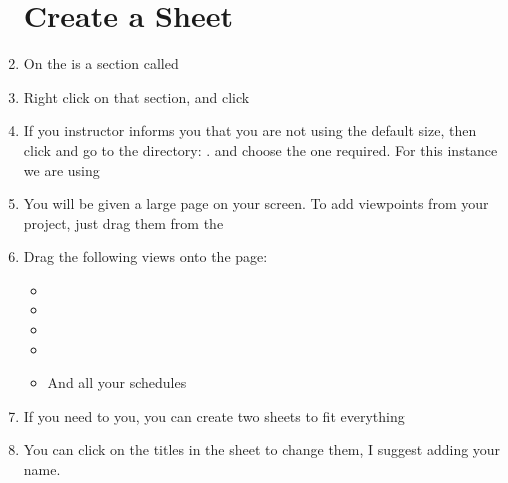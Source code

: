 \documentclass{tufte-book} %
\begin{document}
\begin{enumerate}
\section{Create a Sheet}
	\item On the  is a section called 
	\item Right click on that section, and click 
	\item If you instructor informs you that you are not using the default size, then click  and go to the directory: . and choose the one required. For this instance we are using 
	\item You will be given a large page on your screen. To add viewpoints from your project, just drag them from the 
	\item Drag the following views onto the page:
	\begin{itemize}
		\item {}
		\item {}
		\item {}
		\item {}
		\item And all your schedules
	\end{itemize}
	\item If you need to you, you can create two sheets to fit everything
	\item You can click on the titles in the sheet to change them, I suggest adding your name.
\end{enumerate} 		


	


\backmatter




\printindex %
\end{document}
